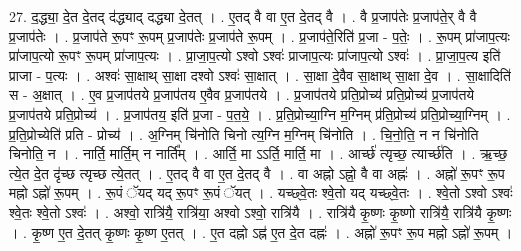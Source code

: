 \documentclass[17pt]{extarticle}
\begin{document}
27. द॒द्ध्या॒ दे॒त दे॒तद् द॑द्ध्याद् दद्ध्या दे॒तत् । . ए॒तद् वै वा ए॒त दे॒तद् वै । . वै प्र॒जाप॑तेः प्र॒जाप॑ते॒र् वै वै प्र॒जाप॑तेः । . प्र॒जाप॑ते रू॒पꣳ रू॒पम् प्र॒जाप॑तेः प्र॒जाप॑ते रू॒पम् । . प्र॒जाप॑ते॒रिति॑ प्र॒जा - प॒तेः॒ । . रू॒पम् प्रा॑जाप॒त्यः प्रा॑जाप॒त्यो रू॒पꣳ रू॒पम् प्रा॑जाप॒त्यः । . प्रा॒जा॒प॒त्यो ऽश्वो ऽश्वः॑ प्राजाप॒त्यः प्रा॑जाप॒त्यो ऽश्वः॑ । . प्रा॒जा॒प॒त्य इति॑ प्राजा - प॒त्यः । . अश्वः॑ सा॒क्षाथ् सा॒क्षा दश्वो ऽश्वः॑ सा॒क्षात् । . सा॒क्षा दे॒वैव सा॒क्षाथ् सा॒क्षा दे॒व । . सा॒क्षादिति॑ स - अ॒क्षात् । . ए॒व प्र॒जाप॑तये प्र॒जाप॑तय ए॒वैव प्र॒जाप॑तये । . प्र॒जाप॑तये प्रति॒प्रोच्य॑ प्रति॒प्रोच्य॑ प्र॒जाप॑तये प्र॒जाप॑तये प्रति॒प्रोच्य॑ । . प्र॒जाप॑तय॒ इति॑ प्र॒जा - प॒त॒ये॒ । . प्र॒ति॒प्रोच्या॒ग्नि म॒ग्निम् प्र॑ति॒प्रोच्य॑ प्रति॒प्रोच्या॒ग्निम् । . प्र॒ति॒प्रोच्येति॑ प्रति - प्रोच्य॑ । . अ॒ग्निम् चि॑नोति चिनो त्य॒ग्नि म॒ग्निम् चि॑नोति । . चि॒नो॒ति॒ न न चि॑नोति चिनोति॒ न । . नार्ति॒ मार्ति॒म् न नार्ति᳚म् । . आर्ति॒ मा ऽऽर्ति॒ मार्ति॒ मा । . आर्च्छ॑ त्यृच्छ॒ त्यार्च्छ॑ति । . ऋ॒च्छ॒ त्ये॒त दे॒त दृ॑च्छ त्यृच्छ त्ये॒तत् । . ए॒तद् वै वा ए॒त दे॒तद् वै । . वा अह्नो ऽह्नो॒ वै वा अह्नः॑ । . अह्नो॑ रू॒पꣳ रू॒प मह्नो ऽह्नो॑ रू॒पम् । . रू॒पं ॅयद् यद् रू॒पꣳ रू॒पं ॅयत् । . यच्छ्वे॒तः श्वे॒तो यद् यच्छ्वे॒तः । . श्वे॒तो ऽश्वो ऽश्वः॑ श्वे॒तः श्वे॒तो ऽश्वः॑ । . अश्वो॒ रात्रि॑यै॒ रात्रि॑या॒ अश्वो ऽश्वो॒ रात्रि॑यै । . रात्रि॑यै कृ॒ष्णः कृ॒ष्णो रात्रि॑यै॒ रात्रि॑यै कृ॒ष्णः । . कृ॒ष्ण ए॒त दे॒तत् कृ॒ष्णः कृ॒ष्ण ए॒तत् । . ए॒त दह्नो ऽह्न॑ ए॒त दे॒त दह्नः॑ । . अह्नो॑ रू॒पꣳ रू॒प मह्नो ऽह्नो॑ रू॒पम् । \newline
\end{document}
